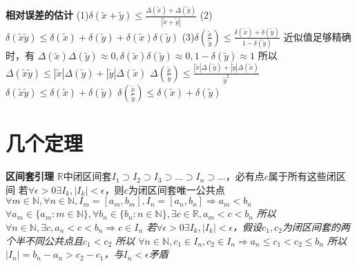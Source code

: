 \documentclass[11pt]{article}
\begin{document}
\textbf{相对误差的估计}
\newline
(1)$\delta(\tilde{x}+\tilde{y}) \le \frac{\Delta(\tilde{x})+\Delta(\tilde{y})}{|\tilde{x}+\tilde{y}|}$
\newline
(2)$\delta(\tilde{x}\tilde{y}) \le \delta(\tilde{x})+\delta(\tilde{y})+\delta(\tilde{x})\delta(\tilde{y})$
\newline
(3)$\delta(\frac{\tilde{x}}{\tilde{y}}) \le \frac{\delta(\tilde{x})+\delta(\tilde{y})}{1-\delta(\tilde{y})}$
\newline
近似值足够精确时，有
\newline
$\Delta(\tilde{x})\Delta(\tilde{y})\approx 0, \delta(\tilde{x})\delta(\tilde{y})\approx 0, 1-\delta(\tilde{y})\approx 1$
\newline
所以
\newline
$\Delta(\tilde{x}\tilde{y}) \le |\tilde{x}|\Delta(\tilde{y})+|\tilde{y}|\Delta(\tilde{x})$
\newline
$\Delta(\frac{\tilde{x}}{\tilde{y}}) \le \frac{|\tilde{x}|\Delta(\tilde{y})+ |\tilde{y}|\Delta(\tilde{x})}{\tilde{y}^2}$
\newline
$\delta(\tilde{x}\tilde{y}) \le \delta(\tilde{x})+\delta(\tilde{y})$
\newline
$\delta(\frac{\tilde{x}}{\tilde{y}}) \le \delta(\tilde{x})+\delta(\tilde{y})$
\newline

\section{几个定理}
\textbf{区间套引理}
\newline
$\mathbb{R}$中闭区间套$I_1\supset I_2\supset I_3\supset\dots\supset I_n\supset\dots$，必有点$c$属于所有这些闭区间
\newline
若$\forall\epsilon>0 \exists I_k, |I_k|<\epsilon$，则$c$为闭区间套唯一公共点
\newline
\textit{$\forall m \in\mathbb{N}, \forall n\in\mathbb{N}, I_m=[a_m,b_m],I_n=[a_n,b_n] \Rightarrow a_m<b_n$
\newline
$\forall a_m\in\{a_m:m\in\mathbb{N}\}, \forall b_n\in\{b_n:n\in\mathbb{N}\}, \exists c\in\mathbb{R}, a_m<c<b_n$
\newline
所以$\forall n\in\mathbb{N}, \exists c, a_n<c<b_n \Rightarrow c\in I_n$
\newline
若$\forall\epsilon>0 \exists I_k, |I_k|<\epsilon$，假设$c_1,c_2$为闭区间套的两个半不同公共点且$c_1<c_2$
\newline
所以 $\forall n\in\mathbb{N}, c_1\in I_n, c_2\in I_n \Rightarrow a_n\le c_1<c_2\le b_n$
\newline
所以 $|I_n|=b_n-a_n>c_2-c_1$，与$I_n<\epsilon$矛盾}
\newline
\end{document}
